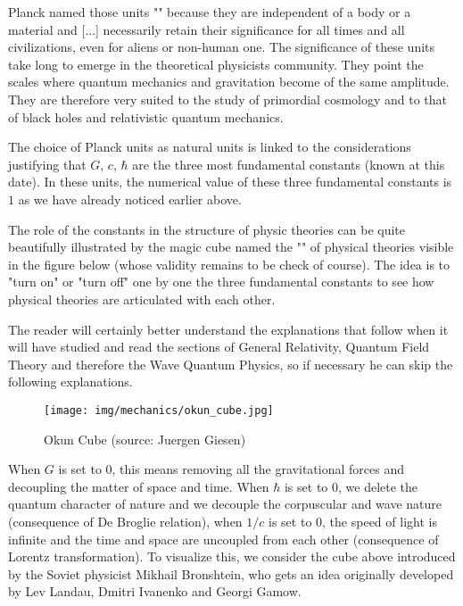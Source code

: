 		Planck named those units "" because they are independent of a body or a material and [...] necessarily retain their significance for all times and all civilizations, even for aliens or non-human one. The significance of these units take long to emerge in the theoretical physicists community. They point the scales where quantum mechanics and gravitation become of the same amplitude. They are therefore very suited to the study of primordial cosmology and to that of black holes and relativistic quantum mechanics.
		
		The choice of Planck units as natural units is linked to the considerations justifying that $G$, $c$, $\hbar$ are the three most fundamental constants (known at this date). In these units, the numerical value of these three fundamental constants is $1$ as we have already noticed earlier above.

	The role of the constants in the structure of physic theories can be quite beautifully illustrated by the magic cube named the "" of physical theories visible in the figure below (whose validity remains to be check of course). The idea is to "turn on" or "turn off" one by one the three fundamental constants to see how physical theories are articulated with each other.
	\begin{tcolorbox}[title=Remark,colframe=black,arc=10pt]
	The reader will certainly better understand the explanations that follow when it will have studied and read the sections of General Relativity, Quantum Field Theory and therefore the Wave Quantum Physics, so if necessary he can skip the following explanations.
	\end{tcolorbox}
	\begin{figure}[H]
		\centering
		\texttt{[image: img/mechanics/okun\_cube.jpg]}
		\caption{Okun Cube (source: Juergen Giesen)}
	\end{figure}
	When $G$ is set to $0$, this means removing all the gravitational forces and decoupling the matter of space and time. When $\hbar$ is set to $0$, we delete the quantum character of nature and we decouple the corpuscular and wave nature (consequence of De Broglie relation), when $1 / c$ is set to $0$, the speed of light is infinite and the time and space are uncoupled from each other (consequence of Lorentz transformation). To visualize this, we consider the cube above introduced by the Soviet physicist Mikhail Bronshtein, who gets an idea originally developed by Lev Landau, Dmitri Ivanenko and Georgi Gamow.
	
